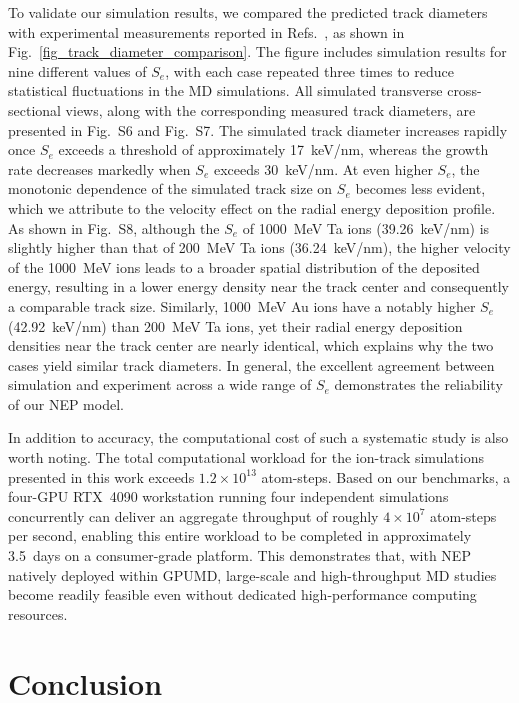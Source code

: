 \documentclass[aip,graphicx,amsmath,amssymb]{revtex4-1}
\begin{document}
To validate our simulation results, we compared the predicted track diameters with
experimental measurements reported in Refs.~,
as shown in Fig.~\ref{fig_track_diameter_comparison}.
The figure includes simulation results for nine different values of $S_e$, with each
case repeated three times to reduce statistical fluctuations in the MD simulations. 
All simulated transverse cross-sectional views, along with the corresponding measured 
track diameters, are presented in Fig.~S6 and Fig.~S7. 
The simulated track diameter increases rapidly once $S_e$ exceeds a threshold of 
approximately 17~keV/nm, whereas the growth rate decreases markedly when $S_e$ exceeds 30~keV/nm.
At even higher $S_e$, the monotonic dependence of the simulated track size on 
$S_e$ becomes less evident, which we attribute to the velocity effect on the radial 
energy deposition profile.
As shown in Fig.~S8, although the $S_e$ of 1000~MeV Ta ions (39.26~keV/nm) is slightly 
higher than that of 200~MeV Ta ions (36.24~keV/nm), the higher velocity of the 
1000~MeV ions leads to a broader spatial distribution of the deposited energy, resulting 
in a lower energy density near the track center and consequently a comparable track size.
Similarly, 1000~MeV Au ions have a notably higher $S_e$ (42.92~keV/nm) than 200~MeV Ta 
ions, yet their radial energy deposition densities near the track center are nearly 
identical, which explains why the two cases yield similar track diameters.
In general, the excellent agreement between simulation and experiment across a wide range of $S_e$ 
demonstrates the reliability of our NEP model.

In addition to accuracy, the computational cost of such a systematic study is also worth
noting. The total computational workload for the ion-track simulations presented
in this work exceeds $1.2\times10^{13}$ atom-steps.
Based on our benchmarks, a four-GPU RTX~4090 workstation running four independent 
simulations concurrently can deliver an aggregate throughput of roughly $4\times10^7$ 
atom-steps per second, enabling this entire workload to be completed in approximately 
3.5~days on a consumer-grade platform.
This demonstrates that, with NEP natively deployed within GPUMD, large-scale and 
high-throughput MD studies become readily feasible even without dedicated 
high-performance computing resources.

\section{Conclusion}
\end{document}
